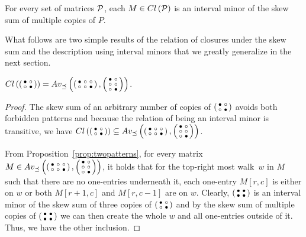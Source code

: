 \begin{obs}
For every set of matrices $\mathcal{P}$, each $M\in Cl\left(\mathcal{P}\right)$ is an interval minor of the skew sum of multiple copies of $P$.
\end{obs}

What follows are two simple results of the relation of closures under the skew sum and the description using interval minors that we greatly generalize in the next section.

\begin{prop}
$Cl\left(\left(\begin{smallmatrix}\bullet&\circ\\\circ&\bullet\end{smallmatrix}\right)\right)=Av_{\preceq}\left(\left(\begin{smallmatrix}\bullet&\circ&\circ\\\circ&\circ&\bullet\end{smallmatrix}\right),\left(\begin{smallmatrix}\bullet&\circ\\\circ&\circ\\\circ&\bullet\end{smallmatrix}\right)\right)$.
\end{prop}
\begin{proof}
The skew sum of an arbitrary number of copies of $\left(\begin{smallmatrix}\bullet&\circ\\\circ&\bullet\end{smallmatrix}\right)$ avoids both forbidden patterns and because the relation of being an interval minor is transitive, we have $Cl\left(\left(\begin{smallmatrix}\bullet&\circ\\\circ&\bullet\end{smallmatrix}\right)\right)\subseteq Av_{\preceq}\left(\left(\begin{smallmatrix}\bullet&\circ&\circ\\\circ&\circ&\bullet\end{smallmatrix}\right),\left(\begin{smallmatrix}\bullet&\circ\\\circ&\circ\\\circ&\bullet\end{smallmatrix}\right)\right)$.

From Proposition~\ref{prop:twopatterns}, for every matrix~$M\in Av_{\preceq}\left(\left(\begin{smallmatrix}\bullet&\circ&\circ\\\circ&\circ&\bullet\end{smallmatrix}\right),\left(\begin{smallmatrix}\bullet&\circ\\\circ&\circ\\\circ&\bullet\end{smallmatrix}\right)\right)$, it holds that for the top-right most walk~$w$ in $M$ such that there are no one-entries underneath it, each one-entry $M[r,c]$ is either on $w$ or both $M[r+1,c]$ and $M[r,c-1]$ are on $w$. Clearly, $\left(\begin{smallmatrix}\bullet&\bullet\\\bullet&\bullet\end{smallmatrix}\right)$ is an interval minor of the skew sum of three copies of $\left(\begin{smallmatrix}\bullet&\circ\\\circ&\bullet\end{smallmatrix}\right)$ and by the skew sum of multiple copies of $\left(\begin{smallmatrix}\bullet&\bullet\\\bullet&\bullet\end{smallmatrix}\right)$ we can then create the whole $w$ and all one-entries outside of it. Thus, we have the other inclusion.
\end{proof}


